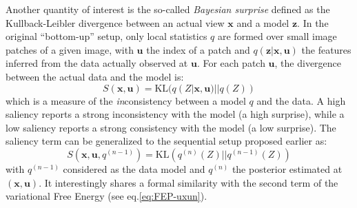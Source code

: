 \documentclass[12pt,twoside,openright]{article}
\begin{document}




Another quantity of interest is the so-called \emph{Bayesian surprise} \cite{itti2005bayesian} defined as the Kullback-Leibler divergence between an actual view $\boldsymbol{x}$ and a model $\boldsymbol{z}$. In the original ``bottom-up'' setup, only local statistics $q$ are formed over small image patches of a given image, with $\boldsymbol{u}$ the index of a patch and $q(\boldsymbol{z}|\boldsymbol{x},\boldsymbol{u})$ the features inferred from the data actually observed at $\boldsymbol{u}$. For each patch $\boldsymbol{u}$, the divergence between the actual data and the model is:
$$ S(\boldsymbol{x},\boldsymbol{u}) = \text{KL}(q(Z| \boldsymbol{x}, \boldsymbol{u})||q(Z))$$
which is a measure of the \emph{in}consistency between a model $q$ and the data. A high saliency reports a strong inconsistency with the model (a high surprise), while a low saliency reports a strong consistency with the model (a low surprise).
The saliency term can be generalized to the sequential setup proposed earlier as:
$$ S(\boldsymbol{x},\boldsymbol{u}, q^{(n-1)}) = \text{KL}(q^{(n)}(Z)||q^{(n-1)}(Z))$$
with $q^{(n-1)}$ considered as the data model and $q^{(n)}$ the posterior estimated at $(\boldsymbol{x},\boldsymbol{u})$.
It interestingly shares a formal similarity with the second term of the variational Free Energy (see eq.\ref{eq:FEP-uxun}). 
\end{document}
